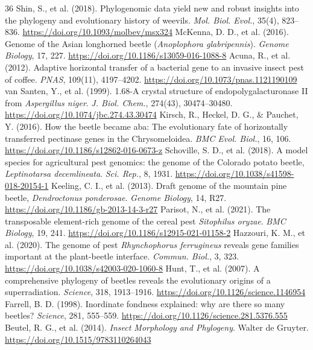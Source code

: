\documentclass[10pt,letterpaper]{article}
\begin{document}
\begin{thebibliography}{36}
 Shin, S., et al. (2018). Phylogenomic data yield new and robust insights into the phylogeny and evolutionary history of weevils. \textit{Mol. Biol. Evol.}, 35(4), 823--836. \url{https://doi.org/10.1093/molbev/msx324}
 McKenna, D. D., et al. (2016). Genome of the Asian longhorned beetle (\textit{Anoplophora glabripennis}). \textit{Genome Biology}, 17, 227. \url{https://doi.org/10.1186/s13059-016-1088-8}
 Acuna, R., et al. (2012). Adaptive horizontal transfer of a bacterial gene to an invasive insect pest of coffee. \textit{PNAS}, 109(11), 4197--4202. \url{https://doi.org/10.1073/pnas.1121190109}
 van Santen, Y., et al. (1999). 1.68-A crystal structure of endopolygalacturonase II from \textit{Aspergillus niger}. \textit{J. Biol. Chem.}, 274(43), 30474--30480. \url{https://doi.org/10.1074/jbc.274.43.30474}
 Kirsch, R., Heckel, D. G., \& Pauchet, Y. (2016). How the beetle became aba: The evolutionary fate of horizontally transferred pectinase genes in the Chrysomeloidea. \textit{BMC Evol. Biol.}, 16, 106. \url{https://doi.org/10.1186/s12862-016-0673-z}
 Schoville, S. D., et al. (2018). A model species for agricultural pest genomics: the genome of the Colorado potato beetle, \textit{Leptinotarsa decemlineata}. \textit{Sci. Rep.}, 8, 1931. \url{https://doi.org/10.1038/s41598-018-20154-1}
 Keeling, C. I., et al. (2013). Draft genome of the mountain pine beetle, \textit{Dendroctonus ponderosae}. \textit{Genome Biology}, 14, R27. \url{https://doi.org/10.1186/gb-2013-14-3-r27}
 Parisot, N., et al. (2021). The transposable element-rich genome of the cereal pest \textit{Sitophilus oryzae}. \textit{BMC Biology}, 19, 241. \url{https://doi.org/10.1186/s12915-021-01158-2}
 Hazzouri, K. M., et al. (2020). The genome of pest \textit{Rhynchophorus ferrugineus} reveals gene families important at the plant-beetle interface. \textit{Commun. Biol.}, 3, 323. \url{https://doi.org/10.1038/s42003-020-1060-8}
 Hunt, T., et al. (2007). A comprehensive phylogeny of beetles reveals the evolutionary origins of a superradiation. \textit{Science}, 318, 1913--1916. \url{https://doi.org/10.1126/science.1146954}
 Farrell, B. D. (1998). Inordinate fondness explained: why are there so many beetles? \textit{Science}, 281, 555--559. \url{https://doi.org/10.1126/science.281.5376.555}
 Beutel, R. G., et al. (2014). \textit{Insect Morphology and Phylogeny}. Walter de Gruyter. \url{https://doi.org/10.1515/9783110264043}

\end{thebibliography}
\end{document}
